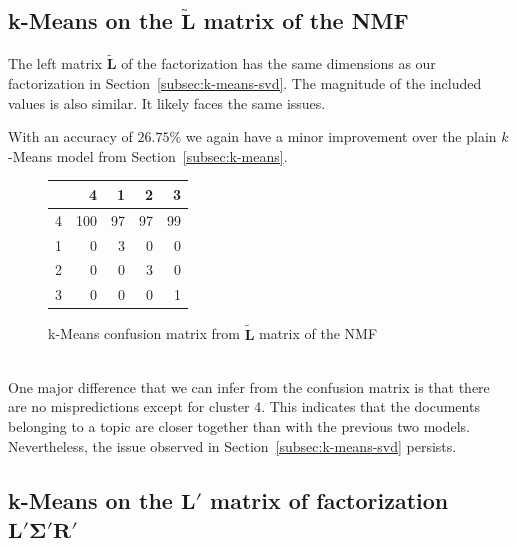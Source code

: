 \documentclass{support/acm_proc_article-sp}
\begin{document}

    \subsection{k-Means on the $\mathbf{\tilde{L}}$ matrix of the NMF}
    \label{subsec:k-means-nmf}

    The left matrix $\mathbf{\tilde{L}}$ of the factorization has the same dimensions as our factorization in
    Section~\ref{subsec:k-means-svd}.
    The magnitude of the included values is also similar.
    It likely faces the same issues.

    With an accuracy of $26.75\%$ we again have a minor improvement over the plain $k$-Means model from
    Section~\ref{subsec:k-means}.
    \begin{figure}[htbp]
        \begin{center}
            \begin{tabular}{r | r r r r}
                & 4 & 1 & 2 & 3 \\
                \hline
                4 & 100 & 97 & 97 & 99 \\
                1 & 0 & 3 & 0 & 0 \\
                2 & 0 & 0 & 3 & 0 \\
                3 & 0 & 0 & 0 & 1
            \end{tabular}
        \end{center}
        \caption{k-Means confusion matrix from $\mathbf{\tilde{L}}$ matrix of the NMF}
        \label{tab:k-means-nmf}
    \end{figure} \\
    One major difference that we can infer from the confusion matrix is that there are no mispredictions except for
    cluster 4.
    This indicates that the documents belonging to a topic are closer together than with the previous two models.
    Nevertheless, the issue observed in Section~\ref{subsec:k-means-svd} persists.


    \subsection{k-Means on the $\mathbf{{L'}}$ matrix of factorization $\mathbf{L'}\mathbf{\Sigma'}\mathbf{R'}$}
\end{document}
